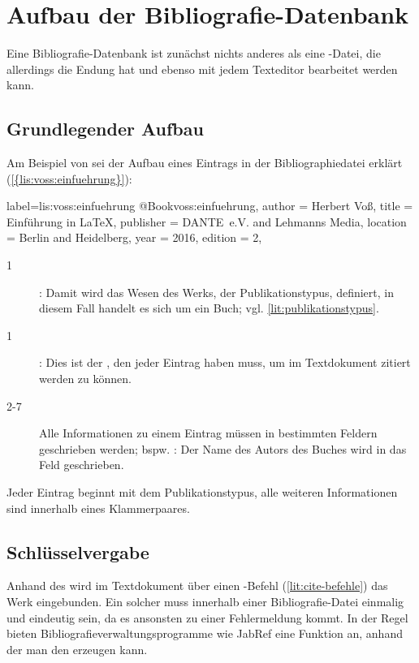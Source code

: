 



\section{Aufbau der Bibliografie-Datenbank}\label{sec:bibliografiedatenbank}
Eine Bibliografie-Datenbank ist zunächst nichts anderes als eine -Datei,
die allerdings die Endung  hat und ebenso mit jedem Texteditor bearbeitet werden kann.

\subsection{Grundlegender Aufbau}
Am Beispiel von \cite{voss:einfuehrung} sei der Aufbau eines Eintrags in der Bibliographiedatei erklärt (\cref{{lis:voss:einfuehrung}}):

\begin{lfgwcode}{label={lis:voss:einfuehrung}}
@Book{voss:einfuehrung,
 author = {Herbert Voß}, 
 title = {Einführung in \LaTeX},
 publisher = {DANTE~e.V. and Lehmanns Media},
 location = {Berlin and Heidelberg},
 year = {2016},
 edition = {2},
}
\end{lfgwcode}

\begin{description}
 \item[1] : Damit wird das Wesen des Werks, der Publikationstypus, definiert, in diesem Fall handelt es sich um ein Buch; vgl. \cref{lit:publikationstypus}.
 \item[1] : Dies ist der , den jeder Eintrag haben muss, um im Textdokument zitiert werden zu können.
 \item[2-7] Alle Informationen zu einem Eintrag müssen in bestimmten Feldern geschrieben werden; bspw. : 
 Der Name des Autors des Buches wird in das Feld  geschrieben. 
\end{description}
Jeder Eintrag beginnt mit dem Publikationstypus, alle weiteren Informationen sind innerhalb eines Klammerpaares.
\subsection{Schlüsselvergabe}
Anhand des  wird im Textdokument über einen -Befehl (\cref{lit:cite-befehle}) das Werk eingebunden.
Ein solcher  muss innerhalb einer Bibliografie-Datei einmalig und eindeutig sein, 
da es ansonsten zu einer Fehlermeldung kommt.
In der Regel bieten Bibliografieverwaltungsprogramme wie JabRef eine Funktion an, anhand der man den  erzeugen kann. 

